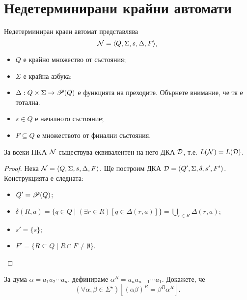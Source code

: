 \section{Недетерминирани крайни автомати}

\begin{dfn}
  Недетерминиран краен автомат представлява
  \[\mathcal{N} = \langle{Q,\Sigma,s,\Delta,F}\rangle,\]
  \begin{itemize}
  \item
    $Q$ е крайно множество от състояния;
  \item
    $\Sigma$ е крайна азбука;
  \item
    $\Delta: Q\times\Sigma \to \mathscr{P}(Q)$ е функцията на преходите.
    Обърнете внимание, че тя е тотална.
  \item
    $s \in Q$ е началното състояние;
  \item
    $F\subseteq Q$ е множеството от финални състояния.
  \end{itemize}
\end{dfn}

\begin{thm}
  За всеки НKА $\mathcal{N}$ съществува еквивалентен на него ДКА $\mathcal{D}$, т.е. $L(\mathcal{N}) = L(\mathcal{D})$.
\end{thm}
\begin{proof}
  Нека $\mathcal{N} = \langle{Q,\Sigma,s,\Delta,F}\rangle$. Ще построим ДКА $\mathcal{D} = (Q',\Sigma,\delta,s',F')$.
  Конструкцията е следната:
  \begin{itemize}
  \item
    $Q' = \mathscr{P}(Q)$;
  \item
    $\delta(R,a) = \{q\in Q\mid (\exists r\in R)[q\in\Delta(r,a)]\} = \bigcup_{r\in R}\Delta(r,a)$;
  \item
    $s' = \{s\}$;
  \item
    $F' = \{R \subseteq Q \mid R\cap F \neq \emptyset\}$.
  \end{itemize}
\end{proof}

\begin{problem}
  За дума $\alpha = a_1a_2\cdots a_n$, дефинираме $\alpha^R = a_na_{n-1}\cdots a_1$.
  Докажете, че
  \[(\forall \alpha,\beta\in\Sigma^\star)[(\alpha\beta)^R = \beta^R\alpha^R].\]
\end{problem}

